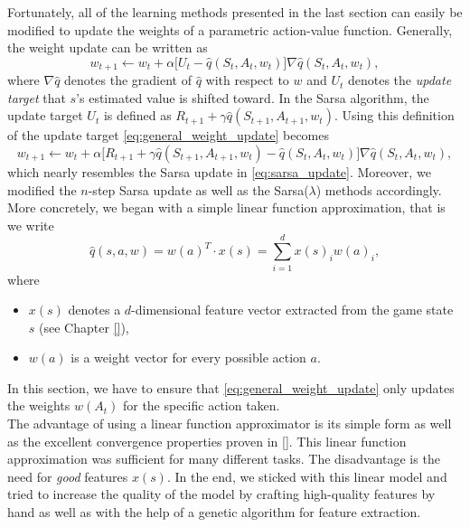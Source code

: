 Fortunately, all of the learning methods presented in the last section can easily be modified to update the weights of a parametric action-value function. Generally, the weight update can be written as
\begin{equation} \label{eq:general_weight_update}
	w_{t+1} \leftarrow w_t + \alpha \big[U_t - \hat q(S_t, A_t, w_t)\big]\nabla \hat q(S_t, A_t, w_t),
\end{equation}
where $\nabla \hat q$ denotes the gradient of $\hat q$ with respect to $w$ and $U_t$ denotes the \emph{update target} that $s$’s estimated value is shifted toward. In the Sarsa algorithm, the update target $U_t$ is defined as $R_{t+1} + \gamma \hat q(S_{t+1}, A_{t+1}, w_{t})$. Using this definition of the update target \ref{eq:general_weight_update} becomes
\begin{equation*}
	w_{t+1} \leftarrow w_t + \alpha \big[R_{t+1} + \gamma \hat q(S_{t+1}, A_{t+1}, w_t) - \hat q(S_t, A_t, w_t)\big]\nabla \hat q(S_t, A_t, w_t),
\end{equation*}
which nearly resembles the Sarsa update in \eqref{eq:sarsa_update}. Moreover, we modified the $n$-step Sarsa update as well as the Sarsa($\lambda$) methods accordingly. \\

More concretely, we began with a simple linear function approximation, that is we write
\begin{equation*}
	\hat q(s, a, w) = w(a)^T \cdot x(s) = \sum_{i=1}^d x(s)_i w(a)_i,
\end{equation*}
where
\begin{itemize}
	\item $x(s)$ denotes a $d$-dimensional feature vector extracted from the game state $s$ (see Chapter \ref{}), 
	\item $w(a)$ is a weight vector for every possible action $a$.
\end{itemize}
In this section, we have to ensure that \eqref{eq:general_weight_update} only updates the weights $w(A_t)$ for the specific action taken. \\

The advantage of using a linear function approximator is its simple form as well as the excellent convergence properties proven in \ref{}. This linear function approximation was sufficient for many different tasks. The disadvantage is the need for \emph{good} features $x(s)$. In the end, we sticked with this linear model and tried to increase the quality of the model by crafting high-quality features by hand as well as with the help of a genetic algorithm for feature extraction. 







